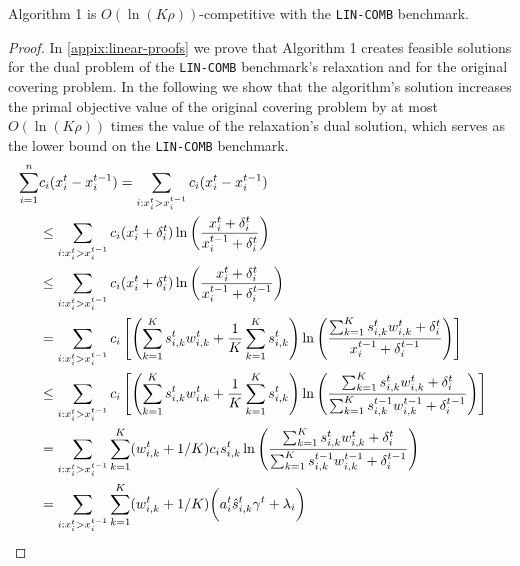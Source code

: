 \begin{theorem} \label{covering-theorem}
Algorithm 1 is $O(\ln(K \rho))$-competitive with the \texttt{LIN-COMB} benchmark.
\end{theorem}
%
\begin{proof} In \cref{appix:linear-proofs} we prove that Algorithm 1 creates feasible solutions for the dual problem of the \texttt{LIN-COMB} benchmark's relaxation and for the original covering problem. In the following we show that the algorithm's solution increases the primal objective value of the original covering problem by at most $O(\ln(K \rho))$ times the value of the relaxation's dual solution, which serves as the lower bound on the \texttt{LIN-COMB} benchmark.
	\begin{align}
		 \sum_{i=1}^{n} &c_{i} (x_{i}^{t} - x_{i}^{t-1})
			= \sum_{i: x_{i}^{t} > x_{i}^{t-1}} c_{i}(x_{i}^{t} - x_{i}^{t-1}) &&  \notag \\
			&\leq \sum_{i: x_{i}^{t} > x_{i}^{t-1}} c_{i}(x_{i}^{t} + \delta_{i}^{t}) \ln \left(\frac{x_{i}^{t} + \delta_{i}^{t}}{x_{i}^{t-1} + \delta_{i}^{t}}\right) \\
			&\leq \sum_{i: x_{i}^{t} > x_{i}^{t-1}} c_{i} (x_{i}^{t} + \delta_{i}^{t}) \ln \left(\frac{x_{i}^{t} + \delta_{i}^{t}}{x_{i}^{t-1} + \delta_{i}^{t-1}}\right) \\
			&= \sum_{i: x_{i}^{t} > x_{i}^{t-1}} c_{i} \left[ \left(\sum_{k=1}^{K}  s_{i,k}^{t} w_{i,k}^{t} + \frac{1}{K} \sum_{k=1}^{K} s_{i,k}^{t} \right)
				\ln \left(\frac{ \sum_{k=1}^{K}  s_{i,k}^{t} w_{i,k}^{t} + \delta_{i}^{t}}{x_{i}^{t-1} + \delta_{i}^{t-1}}  \right) \right] \\
	&\leq \sum_{i: x_{i}^{t} > x_{i}^{t-1}} c_{i} \left[ \left(\sum_{k=1}^{K}  s_{i,k}^{t} w_{i,k}^{t} + \frac{1}{K} \sum_{k=1}^{K} s_{i,k}^{t} \right)
				\ln \left(\frac{ \sum_{k=1}^{K}  s_{i,k}^{t} w_{i,k}^{t} + \delta_{i}^{t}}{\sum_{k=1}^{K}  s_{i,k}^{t-1} w_{i,k}^{t-1} + \delta_{i}^{t-1}}  \right) \right]\\
		&= \sum_{i: x_{i}^{t} > x_{i}^{t-1}} \sum_{k=1}^{K} (w_{i,k}^{t} + 1/K) c_{i} s_{i,k}^{t}
					\ln \left(\frac{ \sum_{k=1}^{K} s_{i,k}^{t} w_{i,k}^{t}  + \delta_{i}^{t}}{\sum_{k=1}^{K}  s_{i,k}^{t-1} w_{i,k}^{t-1}  + \delta_{i}^{t-1}}  \right) \notag \\
	&=  \sum_{i: x_{i}^{t} > x_{i}^{t-1}} \sum_{k=1}^{K} (w_{i,k}^{t} + 1/K) \biggl( a_{i}^{t} \hat{s}_{i,k}^{t} \gamma^t + \lambda_{i} \biggr) \\

\end{align}
\end{proof}
